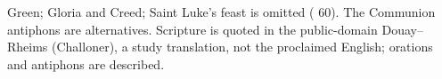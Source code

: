 \vspace{0.1em}
{\footnotesize\noindent Green; Gloria and Creed; Saint Luke's feast is omitted
( 60). The Communion antiphons are alternatives. Scripture
is quoted in the public-domain Douay--Rheims (Challoner), a study translation,
not the proclaimed English; orations and antiphons are described.\par}

